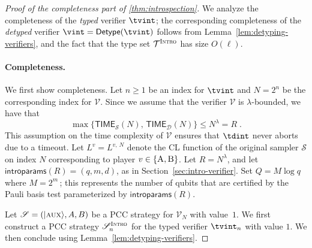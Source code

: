 \documentclass[11pt]{article}
\theoremstyle{definition}
\newcommand{\ket}[1]{|#1\rangle}
\newcommand{\sampler}{\mathcal{S}}
\newcommand{\decider}{\mathcal{D}}
\newcommand{\verifier}{\mathcal{V}}
\newcommand{\strategy}{\mathscr{S}}
\newcommand{\type}{\mathcal{T}}
\newcommand{\gamestyle}[1]{\ensuremath{\textsc{#1}}\xspace}
\newcommand{\intro}{\gamestyle{Intro}}
\newcommand{\labelstyle}[1]{\ensuremath{\textsc{#1}}\xspace}
\newcommand{\aux}{\labelstyle{aux}}
\newcommand{\trole}{\ensuremath{v}}
\newcommand{\alice}{\labelstyle{A}}
\newcommand{\bob}{\labelstyle{B}}
\newcommand{\AB}{\{\alice, \bob\}}
\newcommand{\introparams}{\mathsf{introparams}}
\newcommand{\TIME}{\mathsf{TIME}}
\newcommand{\tmstyle}[1]{\ensuremath{\mathsf{#1}}}
\newcommand{\detype}{\tmstyle{Detype}}
\begin{document}
\begin{proof}[Proof of the completeness part of \cref{thm:introspection}]
  We analyze the completeness of the \emph{typed}
  verifier $\tvint$; the corresponding completeness of the
  \emph{detyped} verifier $\vint = \detype(\tvint)$ follows from
  Lemma~\ref{lem:detyping-verifiers}, and the fact that the type set
  $\type^\intro$ has size $O(\ell)$.

  \paragraph{Completeness.}
  We first show completeness.
  Let $n\geq 1$ be an index for $\tvint$ and $N = 2^n$ be the corresponding
  index for $\verifier$.
  Since we assume that the verifier $\verifier$ is $\lambda$-bounded, we have
  that
  \begin{equation}
    \label{eq:intro-complexity-assump}
    \max \big\{ \TIME_\sampler(N), \, \TIME_\decider(N) \big\} \leq N^\lambda = R\;.
  \end{equation}
  This assumption on the time complexity of $\verifier$ ensures that
  $\tdint$ never aborts due to a timeout.
	Let $L^\trole = L^{\trole,\, N}$ denote the CL function of the original
  sampler $\sampler$ on index $N$ corresponding to player $\trole \in \AB$.
  Let $R = N^\lambda$, and let $\introparams(R) =
  (q,m,d)$, as in Section~\ref{sec:intro-verifier}.
  Set $Q = M\log q$ where $M=2^m$\,; this represents the number of qubits that are
  certified by the Pauli basis test parameterized by $\introparams(R)$.
  
  Let $\strategy = (\ket{\aux}, A, B)$ be a PCC strategy for $\verifier_N$ with
  value~$1$.
  We first construct a PCC strategy $\strategy^\intro_n$ for the typed verifier
  $\tvint_n$ with value $1$.
  We then conclude using Lemma~\ref{lem:detyping-verifiers}.


\end{proof}
\end{document}
